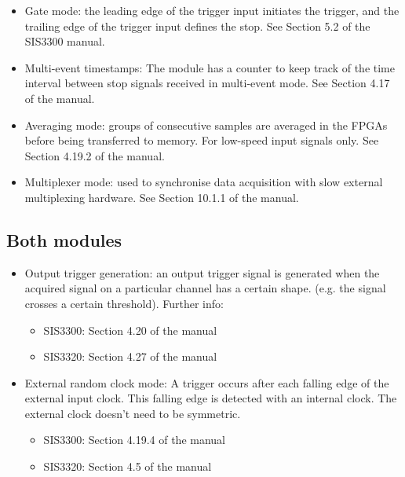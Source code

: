 \documentclass[12pt,a4paper]{article}
\begin{document}
\begin{itemize}
\item Gate mode: the leading edge of the trigger input initiates the trigger,
  and the trailing edge of the trigger input defines the stop. See Section
  5.2 of the SIS3300 manual.
\item Multi-event timestamps: The module has a counter to keep track of the
  time interval between stop signals received in multi-event mode.
  See Section 4.17 of the manual.
\item Averaging mode: groups of consecutive samples are averaged in the FPGAs
  before being transferred to memory. For low-speed input signals only. See
  Section 4.19.2 of the manual.
\item Multiplexer mode: used to synchronise data acquisition with slow
  external multiplexing hardware. See Section 10.1.1 of the manual.
\end{itemize}
\subsection*{Both modules}
\label{sec-3.2}

\begin{itemize}
\item Output trigger generation: an output trigger signal is generated when
  the acquired signal on a particular channel has a certain shape. (e.g.
  the signal crosses a certain threshold). Further info: \\

  \begin{itemize}
  \item SIS3300: Section 4.20 of the manual
  \item SIS3320: Section 4.27 of the manual
  \end{itemize}

\item External random clock mode: A trigger occurs after each falling
  edge of the external input clock. This falling edge is detected with
  an internal clock. The external clock doesn't need to be symmetric.

  \begin{itemize}
  \item SIS3300: Section 4.19.4 of the manual
  \item SIS3320: Section 4.5 of the manual
  \end{itemize}

\end{itemize}
\end{document}
